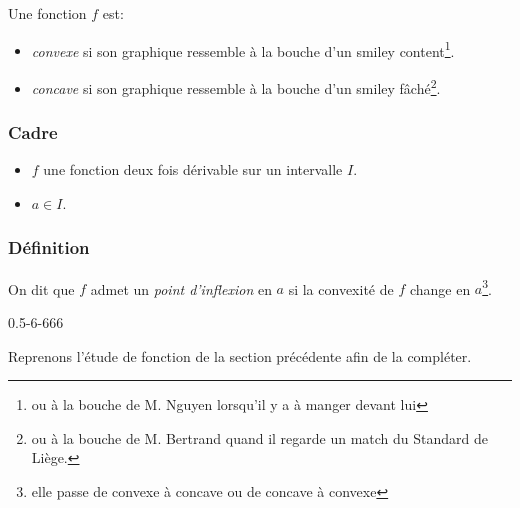\documentclass[main.tex]{subfiles}
\begin{document}
\begin{remark}

    Une fonction $f$ est:
    \begin{itemize}
        \item \emph{convexe} si son graphique ressemble à la bouche d'un smiley content\footnote{ou à la bouche de M. Nguyen lorsqu'il y a à manger devant lui}.
        \item \emph{concave} si son graphique ressemble à la bouche d'un smiley fâché\footnote{ou à la bouche de M. Bertrand quand il regarde un match du Standard de Liège.}.
    \end{itemize}
\end{remark}

\begin{definition}

    \subsubsection{Cadre}

    \begin{itemize}
        \item $f$ une fonction deux fois dérivable sur un intervalle $I$.
        \item $a \in I$.
    \end{itemize}

    \subsubsection{Définition}

    On dit que $f$ admet un \emph{point d'inflexion} en $a$ si la convexité de $f$ change en $a$\footnote{elle passe de convexe à concave ou de concave à convexe}.

    \begin{plot}
        {0.5}{-6}{-6}{6}{6}

    \end{plot}
\end{definition}

Reprenons l'étude de fonction de la section précédente afin de la compléter.
\end{document}
